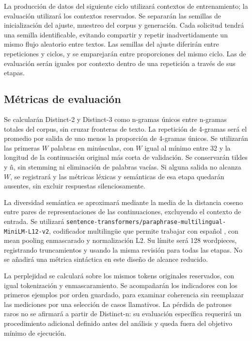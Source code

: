 \documentclass[12pt,letterpaper]{article}
\begin{document}
La producción de datos del siguiente ciclo utilizará contextos de
entrenamiento; la evaluación utilizará los contextos reservados. Se
separarán las semillas de inicialización del ajuste, muestreo del corpus
y generación. Cada solicitud tendrá una semilla identificable, evitando
compartir y repetir inadvertidamente un mismo flujo aleatorio entre textos.
Las semillas del ajuste diferirán entre repeticiones y ciclos, y se
emparejarán entre proporciones del mismo ciclo. Las de evaluación serán
iguales por contexto dentro de una repetición a través de sus etapas.

\subsection{Métricas de evaluación}

Se calcularán Distinct-2 y Distinct-3 como n-gramas únicos entre n-gramas
totales del corpus, sin cruzar fronteras de texto. La repetición de
4-gramas será el promedio por salida de uno menos la proporción de
4-gramas únicos. Se utilizarán las primeras \(W\) palabras en minúsculas,
con \(W\) igual al mínimo entre 32 y la longitud de la continuación
original más corta de validación. Se conservarán tildes y ñ, sin stemming
ni eliminación de palabras vacías. Si alguna salida no alcanza \(W\), se
registrará y las métricas léxicas y semánticas de esa etapa quedarán
ausentes, sin excluir respuestas silenciosamente.

La diversidad semántica se aproximará mediante la media de la distancia
coseno entre pares de representaciones de las continuaciones, excluyendo
el contexto de entrada. Se utilizará
\texttt{sentence-transformers/paraphrase-multilingual-MiniLM-L12-v2},
codificador multilingüe que permite trabajar con español
\cite{multilingualcard}, con mean pooling enmascarado y normalización L2.
Su límite será 128 wordpieces, registrando truncamientos y usando la misma
revisión para todas las etapas. No se añadirá una métrica sintáctica en
este diseño de alcance reducido.

La perplejidad se calculará sobre los mismos tokens originales reservados,
con igual tokenización y enmascaramiento. Se acompañarán los indicadores
con los primeros ejemplos por orden guardado, para examinar coherencia
sin reemplazar las mediciones por una selección de casos llamativos.
La pérdida de patrones raros no se afirmará a partir de Distinct-n: su
evaluación específica requerirá un procedimiento adicional definido antes
del análisis y queda fuera del objetivo mínimo de ejecución.
\end{document}
